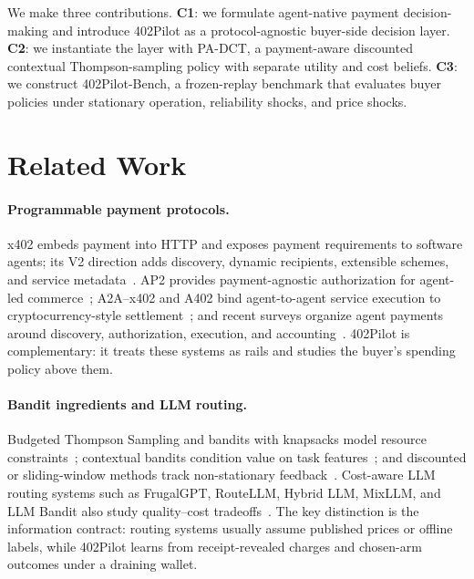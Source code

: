 \documentclass[sigconf, nonacm]{acmart}
\DeclareRobustCommand{\padct}{PA\nobreakdash-DCT}
\begin{document}
We make three contributions. \textbf{C1}: we formulate agent-native payment decision-making and introduce 402Pilot as a protocol-agnostic buyer-side decision layer. \textbf{C2}: we instantiate the layer with \padct, a payment-aware discounted contextual Thompson-sampling policy with separate utility and cost beliefs. \textbf{C3}: we construct 402Pilot-Bench, a frozen-replay benchmark that evaluates buyer policies under stationary operation, reliability shocks, and price shocks.

\section{Related Work}
\label{sec:related-work}

\paragraph{Programmable payment protocols.}
x402 embeds payment into HTTP and exposes payment requirements to software agents; its V2 direction adds discovery, dynamic recipients, extensible schemes, and service metadata~\citep{coinbase2025x402v2}. AP2 provides payment-agnostic authorization for agent-led commerce~\citep{google2025ap2}; A2A--x402 and A402 bind agent-to-agent service execution to cryptocurrency-style settlement~\citep{a2ax402,a402}; and recent surveys organize agent payments around discovery, authorization, execution, and accounting~\citep{sok2026agentpayments}. 402Pilot is complementary: it treats these systems as rails and studies the buyer's spending policy above them.

\paragraph{Bandit ingredients and LLM routing.}
Budgeted Thompson Sampling and bandits with knapsacks model resource constraints~\citep{xia2015bts,badanidiyuru2018bandits}; contextual bandits condition value on task features~\citep{agrawal2013contextualts,li2010linucb}; and discounted or sliding-window methods track non-stationary feedback~\citep{garivier2011discounted,trovo2020sliding,qi2023dsts}. Cost-aware LLM routing systems such as FrugalGPT, RouteLLM, Hybrid LLM, MixLLM, and LLM Bandit also study quality--cost tradeoffs~\citep{chen2023frugalgpt,ong2024routellm,ding2024hybridllm,mixllm2024,llmbandit2025}. The key distinction is the information contract: routing systems usually assume published prices or offline labels, while 402Pilot learns from receipt-revealed charges and chosen-arm outcomes under a draining wallet.
\end{document}
